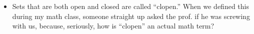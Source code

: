 \documentclass{article}
\begin{document}
\begin{itemize}[label=$\bullet$]

  \item Sets that are both open and closed are called ``clopen.'' When we defined this during my math class, someone straight up asked the prof. if he was screwing with us, because, seriously, how is ``clopen'' an actual math term?
\end{itemize}

\clearpage
\printindex

\end{document}
